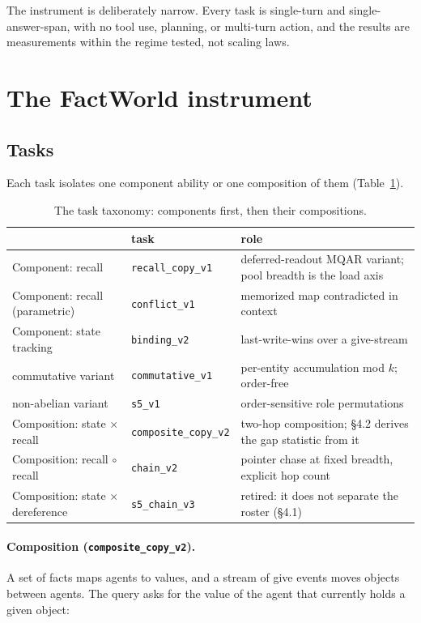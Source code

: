 \documentclass[11pt]{article}
\newcommand{\code}[1]{\texttt{#1}}
\begin{document}
The instrument is deliberately narrow. Every task is single-turn and single-answer-span, with
no tool use, planning, or multi-turn action, and the results are measurements within the
regime tested, not scaling laws.

\section{The FactWorld instrument}

\subsection{Tasks}

Each task isolates one component ability or one composition of them
(Table~\ref{tab:taxonomy}).

\begin{table}[h]
\centering
\small
\begin{tabular}{llp{7.2cm}}
\toprule
 & task & role \\
\midrule
Component: recall & \code{recall\_copy\_v1} & deferred-readout MQAR variant; pool breadth is the load axis \\
Component: recall (parametric) & \code{conflict\_v1} & memorized map contradicted in context \\
Component: state tracking & \code{binding\_v2} & last-write-wins over a give-stream \\
\quad commutative variant & \code{commutative\_v1} & per-entity accumulation mod $k$; order-free \\
\quad non-abelian variant & \code{s5\_v1} & order-sensitive role permutations \\
Composition: state $\times$ recall & \code{composite\_copy\_v2} & two-hop composition; \S4.2 derives the gap statistic from it \\
Composition: recall $\circ$ recall & \code{chain\_v2} & pointer chase at fixed breadth, explicit hop count \\
Composition: state $\times$ dereference & \code{s5\_chain\_v3} & retired: it does not separate the roster (\S4.1) \\
\bottomrule
\end{tabular}
\caption{The task taxonomy: components first, then their compositions.}
\label{tab:taxonomy}
\end{table}

\paragraph{Composition (\code{composite\_copy\_v2}).} A set of facts maps agents to values,
and a stream of give events moves objects between agents. The query asks for the value of the
agent that currently holds a given object:
\end{document}
